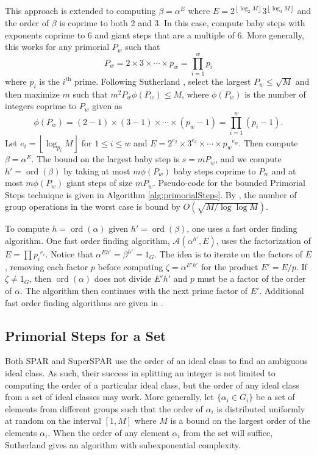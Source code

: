 \documentclass{ucalgthes1}
\theoremstyle{definition}
\DeclareMathOperator{\ord}{ord}
\newcommand{\floor}[1]{\left\lfloor #1 \right\rfloor}
\begin{document}
This approach is extended to computing $\beta = \alpha^E$ where $E = 2^{\floor{\log_2 M}} 3^{\floor{\log_3 M}}$ and the order of $\beta$ is coprime to both 2 and 3.  In this case, compute baby steps with exponents coprime to 6 and giant steps that are a multiple of 6.  More generally, this works for any primorial $P_w$ such that
\[
	P_w = 2 \times 3 \times \cdots \times p_w = \prod_{i=1}^w p_i
\]
where $p_i$ is the $i^{\textrm{th}}$ prime.  Following Sutherland \cite[p.57]{Sutherland2007}, select the largest $P_w \le \sqrt{M}$ and then maximize $m$ such that $m^2P_w \phi(P_w) \le M$, where $\phi(P_w)$ is the number of integers coprime to $P_w$ given as
\begin{equation}
\label{eq:phiPrimorial}
	\phi(P_w) = (2-1) \times (3-1) \times \cdots \times (p_w - 1) = \prod_{i=1}^w (p_i - 1).
\end{equation}
Let $e_i = \floor{\log_{p_i} M}$ for $1 \le i \le w$ and $E = 2^{e_2} \times 3^{e_3} \times \cdots \times {p_w}^{e_w}$.  Then compute $\beta = \alpha^E$.  The bound on the largest baby step is $s = m P_w$, and we compute $h' = \ord(\beta)$ by taking at most $m \phi(P_w)$ baby steps coprime to $P_w$ and at most $m \phi(P_w)$ giant steps of size $m P_w$.  Pseudo-code for the bounded Primorial Steps technique is given in Algorithm \ref{alg:primorialSteps}.  By \cite[p.59~Proposition~4.2]{Sutherland2007}, the number of group operations in the worst case is bound by $O(\sqrt{M / \log \log M})$.

To compute $h = \ord(\alpha)$ given $h' = \ord(\beta)$, one uses a fast order finding algorithm.  One fast order finding algorithm, $\mathcal A(\alpha^{h'}, E)$, uses the factorization of $E=\prod {p_i}^{e_i}$.  Notice that $\alpha^{Eh'} = \beta^{h'} = 1_G$.  The idea is to iterate on the factors of $E$, removing each factor $p$ before computing $\zeta = \alpha^{E'h'}$ for the product $E' = E/p$. If $\zeta \neq 1_G$, then $\ord(\alpha)$ does not divide $E'h'$ and $p$ must be a factor of the order of $\alpha$.  The algorithm then continues with the next prime factor of $E'$.  Additional fast order finding algorithms are given in \mbox{\cite[Chapter~7]{Sutherland2007}}.

\subsection{Primorial Steps for a Set}
\label{subsec:primorialStepsForASet}

Both SPAR and SuperSPAR use the order of an ideal class to find an ambiguous ideal class.  As such, their success in splitting an integer is not limited to computing the order of a particular ideal class, but the order of any ideal class from a set of ideal classes may work.  More generally, let $\{ \alpha_i \in G_i \}$ be a set of elements from different groups such that the order of $\alpha_i$ is distributed uniformly at random on the interval $[1, M]$ where $M$ is a bound on the largest order of the elements $\alpha_i$.  When the order of any element $\alpha_i$ from the set will suffice, Sutherland \cite[\S 5.4]{Sutherland2007} gives an algorithm with subexponential complexity.
\end{document}
